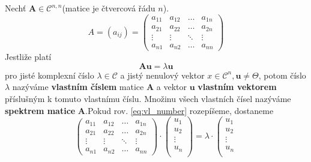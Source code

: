      \begin{definition} Nechť $\mathbf{A}\in \mathcal{C}^{n,n}$(matice je čtvercová řádu $n$).     
        $$A = \left(a_{ij}\right) =
        \left(
          \begin{array}{cccc}
            a_{11} & a_{12} & \ldots & a_{1n} \\
            a_{21} & a_{22} & \ldots & a_{2n} \\
            \vdots & \vdots & \ddots & \vdots \\
            a_{n1} & a_{n2} & \ldots & a_{nn}
          \end{array}
        \right)$$
        Jestliže platí
        \begin{equation}\label{eq:vl_number}
          \mathbf{Au} = \lambda\mathbf{u}
        \end{equation}
        pro jisté komplexní číslo $\lambda\in\mathcal{C}$  a jistý nenulový vektor $x\in\mathcal{C}^n, 
        \mathbf{u}\neq\Theta$, potom číslo $\lambda$ nazýváme \textbf{vlastním číslem} matice $\mathbf{A}$ a 
        vektor $\mathbf{u}$ \textbf{vlastním vektorem} příslušným k tomuto vlastnímu číslu. Množinu všech 
        vlastních čísel nazýváme \textbf{spektrem matice} $\mathbf{A}$.Pokud rov. \ref{eq:vl_number} 
        rozepíšeme, dostaneme
        \begin{equation}
          \left(
            \begin{array}{cccc}
              a_{11} & a_{12} & \ldots & a_{1n} \\
              a_{21} & a_{22} & \ldots & a_{2n} \\
              \vdots & \vdots & \ddots & \vdots \\
              a_{n1} & a_{n2} & \ldots & a_{nn}
            \end{array}
        \right)\cdot
        \left(
          \begin{array}{c}
            u_{1} \\  u_{2} \\ \vdots \\  u_{n} \\
          \end{array}
        \right)=\lambda\cdot
        \left(
          \begin{array}{c}
            u_{1} \\ u_{2} \\ \vdots \\ u_{n} \\
          \end{array}

\end{equation}
\end{definition}
